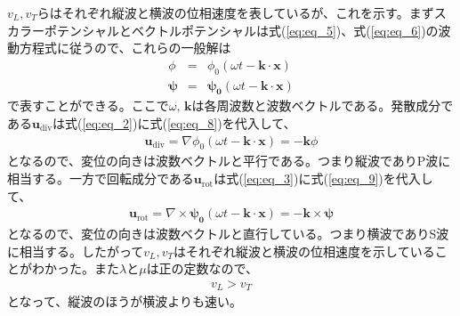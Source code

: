 $v_{L},v_{T}$らはそれぞれ縦波と横波の位相速度を表しているが、これを示す。まずスカラーポテンシャルとベクトルポテンシャルは式(\ref{eq:eq_5})、式(\ref{eq:eq_6})の波動方程式に従うので、これらの一般解は
\begin{eqnarray}
  \phi &=& \phi_{0}(\omega{t}-\bm{k}\cdot{\bm{x}}) \label{eq:eq_8}\\
  \bm{\psi} &=& \bm{\psi_{0}}(\omega{t}-\bm{k}\cdot{\bm{x}}) \label{eq:eq_9}
\end{eqnarray}
で表すことができる。ここで$\omega,\,\bm{k}$は各周波数と波数ベクトルである。発散成分である$\bm{u}_{\mathrm{div}}$は式(\ref{eq:eq_2})に式(\ref{eq:eq_8})を代入して、
\begin{eqnarray}
  \bm{u}_{\mathrm{div}} = \nabla{\phi_{0}(\omega{t}-\bm{k}\cdot{\bm{x}})} =-\bm{k}{\phi}
\end{eqnarray}
となるので、変位の向きは波数ベクトルと平行である。つまり縦波でありP波に相当する。一方で回転成分である$\bm{u}_{\mathrm{rot}}$は式(\ref{eq:eq_3})に式(\ref{eq:eq_9})を代入して、
\begin{eqnarray}
  \bm{u}_{\mathrm{rot}} = \nabla\times{\bm{\psi_{0}}(\omega{t}-\bm{k}\cdot{\bm{x}})} =-\bm{k}\times{\bm{\psi}}
\end{eqnarray}
となるので、変位の向きは波数ベクトルと直行している。つまり横波でありS波に相当する。したがって$v_{L},v_{T}$はそれぞれ縦波と横波の位相速度を示していることがわかった。また$\lambda$と$\mu$は正の定数なので、
\begin{eqnarray}
  v_{L} > v_{T}
\end{eqnarray}
となって、縦波のほうが横波よりも速い。








